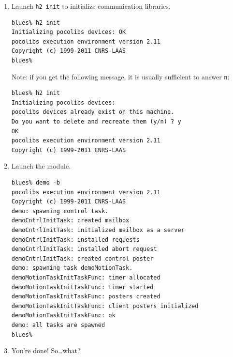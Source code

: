 \begin{enumerate}
\item Launch \texttt{h2 init} to initialize communication libraries.

\begin{center}\begin{cartouche}\small\begin{verbatim}
blues% h2 init
Initializing pocolibs devices: OK
pocolibs execution environment version 2.11
Copyright (c) 1999-2011 CNRS-LAAS
blues%
\end{verbatim}\end{cartouche}\end{center}

Note: if you get the following message, it is usually sufficient to
answer \texttt{n}:

\begin{center}\begin{cartouche}\small\begin{verbatim}
blues% h2 init
Initializing pocolibs devices: 
pocolibs devices already exist on this machine.
Do you want to delete and recreate them (y/n) ? y
OK
pocolibs execution environment version 2.11
Copyright (c) 1999-2011 CNRS-LAAS
\end{verbatim}\end{cartouche}\end{center}

\item Launch the module.

\begin{center}\begin{cartouche}\small\begin{verbatim}
blues% demo -b
pocolibs execution environment version 2.11
Copyright (c) 1999-2011 CNRS-LAAS
demo: spawning control task.
demoCntrlInitTask: created mailbox
demoCntrlInitTask: initialized mailbox as a server
demoCntrlInitTask: installed requests
demoCntrlInitTask: installed abort request
demoCntrlInitTask: created control poster
demo: spawning task demoMotionTask.
demoMotionTaskInitTaskFunc: timer allocated
demoMotionTaskInitTaskFunc: timer started
demoMotionTaskInitTaskFunc: posters created
demoMotionTaskInitTaskFunc: client posters initialized
demoMotionTaskInitTaskFunc: ok
demo: all tasks are spawned
blues% 
\end{verbatim}\end{cartouche}\end{center}

\item You're done! So\ldots what?
\end{enumerate}


